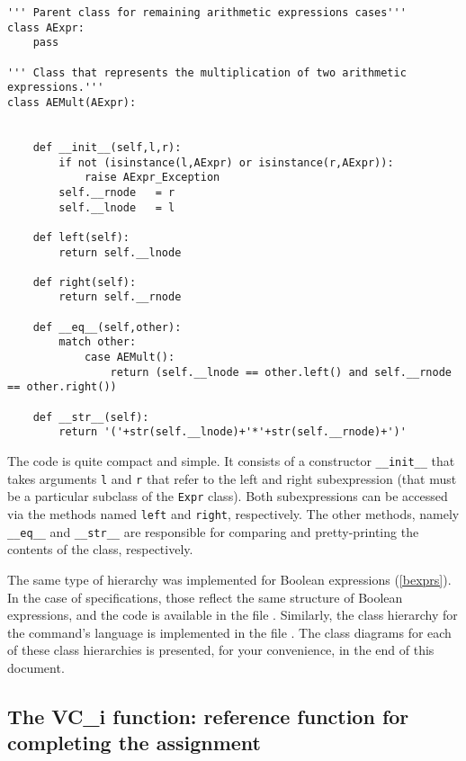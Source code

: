\documentclass[11pt]{article}
\begin{document}
\begin{lstlisting}[style=Python]
''' Parent class for remaining arithmetic expressions cases'''
class AExpr:
    pass

''' Class that represents the multiplication of two arithmetic expressions.'''
class AEMult(AExpr):


    def __init__(self,l,r):
        if not (isinstance(l,AExpr) or isinstance(r,AExpr)):
            raise AExpr_Exception
        self.__rnode   = r
        self.__lnode   = l

    def left(self):
        return self.__lnode

    def right(self):
        return self.__rnode

    def __eq__(self,other):
        match other:
            case AEMult():
                return (self.__lnode == other.left() and self.__rnode == other.right())

    def __str__(self):
        return '('+str(self.__lnode)+'*'+str(self.__rnode)+')'  
\end{lstlisting}
The code is quite compact and simple. It consists of a constructor \lstinline!__init__! that takes arguments \lstinline!l! and \lstinline!r! that refer to the left and right subexpression (that must be a particular subclass of the \lstinline!Expr! class). Both subexpressions can be accessed via the methods named \lstinline!left! and \lstinline!right!, respectively. The other methods, namely \lstinline!__eq__! and \lstinline!__str__! are responsible for comparing and pretty-printing the contents of the class, respectively.


The same type of hierarchy was implemented for Boolean expressions (\cref{bexprs}). In the case of specifications, those reflect the same structure of Boolean expressions, and the code is available in the file . Similarly, the class hierarchy for the command's language is implemented in the file . The class diagrams for each of these class hierarchies is presented, for your convenience, in the end of this document.

\subsection{The VC\_i function: reference function for completing the assignment}
\end{document}
